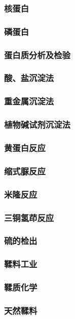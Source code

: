 \documentclass[UTF8]{../../ApplicationUniverse}
\begin{document}
                \subsubsection{核蛋白}
                \subsubsection{磷蛋白}
    \subsubsection{蛋白质分析及检验}
        \subsubsection{酸、盐沉淀法}
        \subsubsection{重金属沉淀法}
        \subsubsection{植物碱试剂沉淀法}
        \subsubsection{黄蛋白反应}
        \subsubsection{缩式脲反应}
        \subsubsection{米隆反应}
        \subsubsection{三铜氢茚反应}
        \subsubsection{硫的检出}
\subsubsection{鞣料工业}
    \subsubsection{鞣质化学}
    \subsubsection{天然鞣料}
\end{document}
